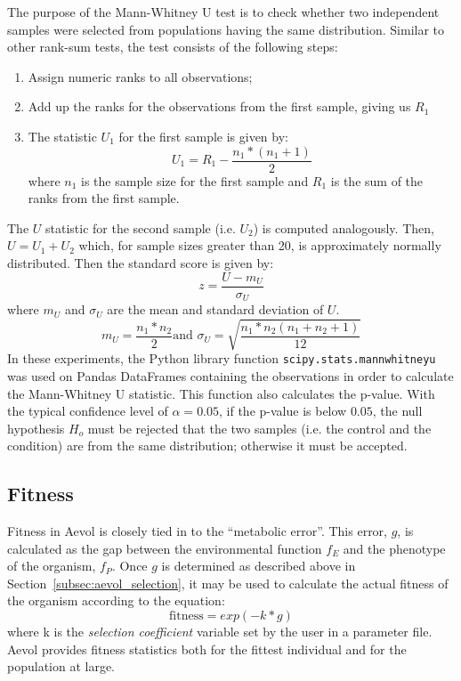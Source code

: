 The purpose of the Mann-Whitney U test is to check whether two independent samples were selected from populations having the same distribution. Similar to other rank-sum tests, the test consists of the following steps:
\begin{enumerate}
	\item Assign numeric ranks to all observations;
	\item Add up the ranks for the observations from the first sample, giving us $R_1$
	\item The statistic $U_1$ for the first sample is given by:
	\begin{equation*}
	U_1 = R_1 - \frac{n_1*(n_1 + 1)}{2}
	\end{equation*}
	where $n_1$ is the sample size for the first sample and $R_1$ is the sum of the ranks from the first sample.
\end{enumerate}
The $U$ statistic for the second sample (i.e. $U_2$) is computed analogously. Then, $U = U_1 + U_2$ which, for sample sizes greater than 20, is approximately normally distributed. Then the standard score is given by:
\begin{equation*}
z = \frac{U - m_U}{\sigma_U}
\end{equation*}
where $m_U$ and $\sigma_U$ are the mean and standard deviation of $U$.
\begin{equation*}
m_U = \frac{n_1*n_2}{2} \text{and } \sigma_U = \sqrt{\frac{n_1*n_2\left(n_1 + n_2 +1\right)}{12}}
\end{equation*} In these experiments, the Python library function \texttt{scipy.stats.mannwhitneyu} was used on Pandas DataFrames containing the observations in order to calculate the Mann-Whitney U statistic. This function also calculates the p-value. With the typical confidence level of $\alpha = 0.05$, if the p-value is below $0.05$, the null hypothesis $H_o$ must be rejected that the two samples (i.e. the control and the condition) are from the same distribution; otherwise it must be accepted.

\subsection{Fitness}
Fitness in Aevol is closely tied in to the ``metabolic error''. This error, $g$, is calculated as the gap between the environmental function $f_E$ and the phenotype of the organism, $f_P$. Once $g$ is determined as described above in Section~\ref{subsec:aevol_selection}, it may be used to calculate the actual fitness of the organism according to the equation:
\begin{equation*}
\text{fitness} = exp(-k*g)
\end{equation*} 
where k is the \textit{selection coefficient} variable set by the user in a parameter file. Aevol provides fitness statistics both for the fittest individual and for the population at large.
